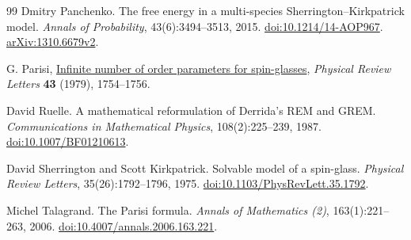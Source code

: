 \begin{thebibliography}{99}
Dmitry Panchenko.
The free energy in a multi-species Sherrington--Kirkpatrick model.
\emph{Annals of Probability}, 43(6):3494--3513, 2015.
\href{https://doi.org/10.1214/14-AOP967}{doi:10.1214/14-AOP967}.
\href{https://arxiv.org/abs/1310.6679v2}{arXiv:1310.6679v2}.

G. Parisi,
\href{https://doi.org/10.1103/PhysRevLett.43.1754}{Infinite number of order parameters for spin-glasses},
\emph{Physical Review Letters} \textbf{43} (1979), 1754--1756.

David Ruelle.
A mathematical reformulation of Derrida's REM and GREM.
\emph{Communications in Mathematical Physics}, 108(2):225--239, 1987.
\href{https://doi.org/10.1007/BF01210613}{doi:10.1007/BF01210613}.

David Sherrington and Scott Kirkpatrick.
Solvable model of a spin-glass.
\emph{Physical Review Letters}, 35(26):1792--1796, 1975.
\href{https://doi.org/10.1103/PhysRevLett.35.1792}{doi:10.1103/PhysRevLett.35.1792}.

Michel Talagrand.
The Parisi formula.
\emph{Annals of Mathematics (2)}, 163(1):221--263, 2006.
\href{https://doi.org/10.4007/annals.2006.163.221}{doi:10.4007/annals.2006.163.221}.

\end{thebibliography}
